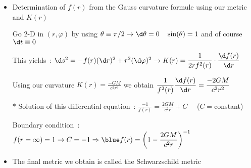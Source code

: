 \Tr
\begin{itemize}
\item Determination of $f(r)$ from the Gauss curvature formule using our metric and $K(r)$
\item[] Go 2-D in $(r,\varphi)$ by using $\theta \equiv \pi/2 \rightarrow \d\theta=0 \quad \sin(\theta)=1$
        and of course $\d t \equiv 0$
\item[] This yields~: $\d s^{2}=-f(r)(\d r)^{2}+r^{2}(\d\varphi)^{2}
        \rightarrow \displaystyle K(r)=\frac{1}{2rf^{2}(r)}\cdot\frac{\d f(r)}{\d r}$
\item[] Using our curvature $\displaystyle K(r)=\frac{-GM}{c^{2}r^{3}}$ we obtain
        $\displaystyle \frac{1}{f^{2}(r)}\frac{\d f(r)}{\d r}=\frac{-2GM}{c^{2}r^{2}}$
\item[$\ast$] Solution of this differential equation~:
              $\displaystyle \frac{-1}{f(r)}=\frac{2GM}{c^{2}r}+C \quad$ ($C=$constant)
\item[] Boundary condition~: $f(r=\infty)=1 \rightarrow C=-1
        \Rightarrow {\displaystyle \blue f(r)=\left(1-\frac{2GM}{c^{2}r}\right)^{-1}}$
\item The final metric we obtain is called the {\blue Schwarzschild metric}\\
\item[]{\red {}}
\end{itemize}

